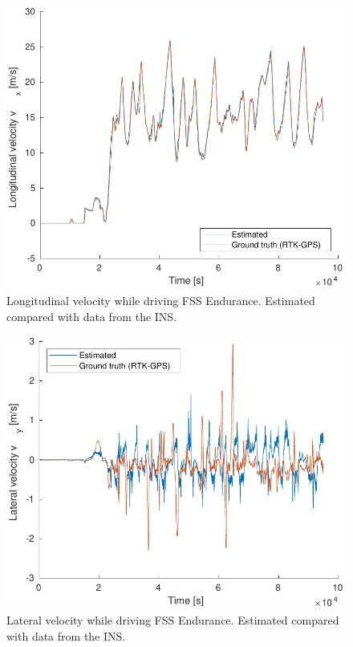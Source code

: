 \begin{figure}
    \centering
    \includegraphics[width=0.8\linewidth]{0_Images/6_Results/vxFSSEndurance.pdf}
    \caption[Longitudinal velocity while driving FSS Endurance.]
    {Longitudinal velocity  while driving FSS Endurance. Estimated compared with data from the INS.}
    \label{Fig:VxFSSEndurance}
\end{figure}
\begin{figure}
    \centering
    \includegraphics[width=0.8\linewidth]{0_Images/6_Results/vyFSSEndurance.pdf}
    \caption[Lateral velocity while driving FSS Endurance.]
    {Lateral velocity while driving FSS Endurance. Estimated compared with data from the INS.}
    \label{Fig:VyFSSEndurance}
\end{figure}

